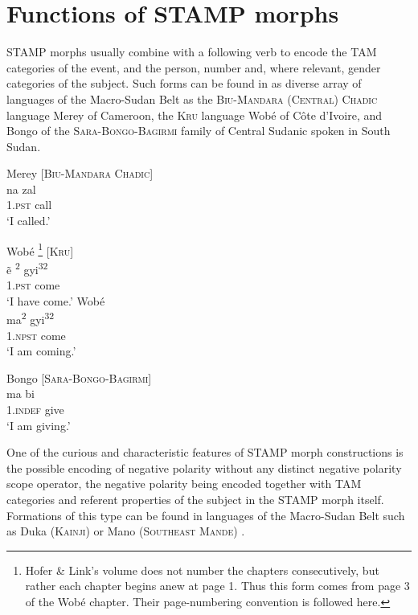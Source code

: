 \documentclass[output=paper]{langsci/langscibook}
\begin{document}
                  
 

\newpage
\section{Functions of STAMP morphs}\label{sec:Anderson:3}

STAMP morphs usually combine with a following verb to encode the TAM categories of the event, and the person, number and, where relevant, gender categories of the subject. Such forms can be found in as diverse array of languages of the Macro-Sudan Belt as the \textsc{Biu-Mandara (Central) Chadic} language Merey  of Cameroon, the \textsc{Kru} language Wobé  of Côte d'Ivoire, and Bongo of the \textsc{Sara-Bongo-Bagirmi} family of Central Sudanic  spoken in South Sudan.

\ea\label{ex:anderson:3}
Merey  \citep[8]{Gravina2007}                  \textsc{[Biu-Mandara Chadic]}\\
\gll na  zal    \\
\textsc{1.pst}  call   \\
\glt `I called.'  
\z


\ea\label{ex:anderson:4}
\ea\label{ex:anderson:4a}
Wobé \citep[Wobé 3]{HoferLink1973}\footnote{Hofer \& Link's volume does not number the chapters consecutively, but rather each chapter begins anew at page 1. Thus this form comes from page 3 of the Wobé chapter. Their page-numbering convention is followed here.}    \textsc{[Kru]}\\
\gll ẽ\textsuperscript{ 2}    gyi\textsuperscript{32}            \\
1.\textsc{pst}  come  \\
\glt `I have come.'            
\ex \label{ex:anderson:4b}
Wobé\\
\gll  ma\textsuperscript{2}  gyi\textsuperscript{32}\\
1.\textsc{npst}  come\\
\glt `I am coming.'  
\z
\z

\ea\label{ex:anderson:5}
Bongo   \citep[75]{TuckerBryan1966}       [\textsc{Sara-Bongo-Bagirmi}]\\
\gll ma    bi\\
1.\textsc{indef}  give  \\
\glt `I am giving.'
\z

One of the curious and characteristic features of STAMP morph constructions is the possible encoding of negative polarity without any distinct negative polarity scope operator, the negative polarity being encoded together with TAM categories and referent properties of the subject in the STAMP morph itself. Formations of this type can be found in languages of the Macro-Sudan Belt such as Duka (\textsc{Kainji})  or Mano (\textsc{Southeast Mande}) . 
\end{document}

